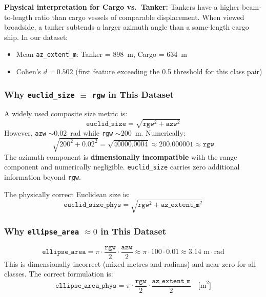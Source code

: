 \documentclass[journal]{IEEEtran}
\begin{document}
\textbf{Physical interpretation for Cargo vs.\ Tanker:}
Tankers have a higher beam-to-length ratio than cargo vessels of comparable
displacement. When viewed broadside, a tanker subtends a larger azimuth angle
than a same-length cargo ship. In our dataset:
\begin{itemize}
  \item Mean \texttt{az\_extent\_m}: Tanker = 898~m, Cargo = 634~m
  \item Cohen's $d = 0.502$ (first feature exceeding the 0.5 threshold for
        this class pair)
\end{itemize}

\subsubsection{Why \texttt{euclid\_size} $\equiv$ \texttt{rgw} in This Dataset}

A widely used composite size metric is:
\begin{equation}
  \texttt{euclid\_size} = \sqrt{\texttt{rgw}^2 + \texttt{azw}^2}
\end{equation}
However, \texttt{azw} $\sim 0.02$~rad while \texttt{rgw} $\sim 200$~m.
Numerically:
\begin{equation}
  \sqrt{200^2 + 0.02^2} = \sqrt{40000.0004} \approx 200.000001 \approx \texttt{rgw}
\end{equation}
The azimuth component is \textbf{dimensionally incompatible} with the range
component and numerically negligible. \texttt{euclid\_size} carries zero
additional information beyond \texttt{rgw}.

The physically correct Euclidean size is:
\begin{equation}
  \texttt{euclid\_size\_phys} = \sqrt{\texttt{rgw}^2 + \texttt{az\_extent\_m}^2}
\end{equation}

\subsubsection{Why \texttt{ellipse\_area} $\approx 0$ in This Dataset}

\begin{equation}
  \texttt{ellipse\_area} = \pi \cdot \frac{\texttt{rgw}}{2} \cdot \frac{\texttt{azw}}{2}
  \approx \pi \cdot 100 \cdot 0.01 \approx 3.14 \text{ m}\cdot\text{rad}
\end{equation}
This is dimensionally incorrect (mixed metres and radians) and near-zero for all
classes. The correct formulation is:
\begin{equation}
  \texttt{ellipse\_area\_phys} = \pi \cdot \frac{\texttt{rgw}}{2} \cdot
  \frac{\texttt{az\_extent\_m}}{2} \quad \text{[m}^2\text{]}
\end{equation}
\end{document}
